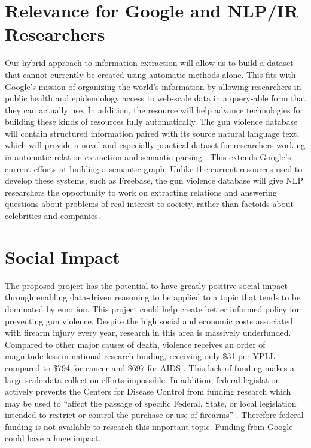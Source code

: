 \documentclass[11pt]{article}
\begin{document}
\section{Relevance for Google and NLP/IR Researchers}

Our hybrid approach to information extraction will allow us to build a dataset that cannot currently be created using automatic methods alone. This fits with Google's mission of organizing the world's information by allowing researchers in public health and epidemiology access to web-scale data in a query-able form that they can actually use. In addition, the resource will help advance technologies for building these kinds of resources fully automatically. The gun violence database will contain structured information paired with its source natural language text, which will provide a novel and especially practical dataset for researchers working in automatic relation extraction and semantic parsing \cite{mintz2009distant} \cite{cai2013semantic} \cite{yao2014information}.  This extends Google's current efforts at building a semantic graph.  Unlike the current resources used to develop these systems, such as Freebase, the gun violence database will give NLP researchers the opportunity to work on extracting relations and answering questions about problems of real interest to society, rather than factoids about celebrities and companies. 

\section{Social Impact}

The proposed project has the potential to have greatly positive social impact through enabling data-driven reasoning to be applied to a topic that tends to be dominated by emotion.  This project could help create better informed policy for preventing gun violence. Despite the high social and economic costs associated with firearm injury every year, research in this area is massively underfunded. Compared to other major causes of death, violence receives an order of magnitude less in national research funding, receiving only \$31 per YPLL compared to \$794 for cancer and \$697 for AIDS \cite{roth1993understanding}. This lack of funding makes a large-scale data collection efforts impossible. In addition, federal legislation actively prevents the Centers for Disease Control  from funding research which may be used to ``affect the passage of specific Federal, State, or local legislation intended to restrict or control the purchase or use of firearms'' \cite{kassirer1995partisan}.  Therefore federal funding is not available to research this important topic.  Funding from Google could have a huge impact.
\end{document}
